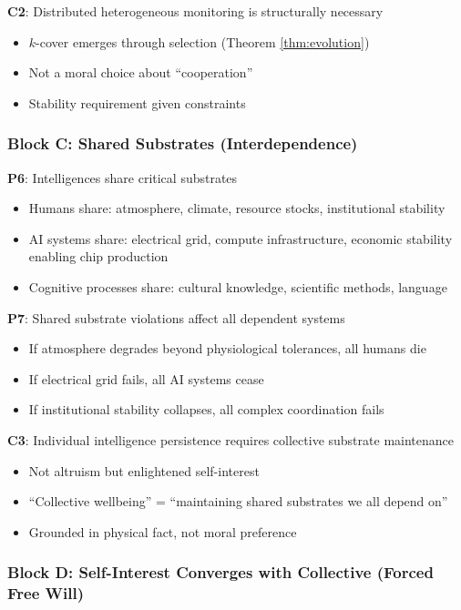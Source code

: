\documentclass[11pt,a4paper]{article}
\theoremstyle{definition}
\begin{document}
\textbf{C2}: Distributed heterogeneous monitoring is structurally necessary
\begin{itemize}
\item $k$-cover emerges through selection (Theorem \ref{thm:evolution})
\item Not a moral choice about ``cooperation''
\item Stability requirement given constraints
\end{itemize}

\subsubsection*{Block C: Shared Substrates (Interdependence)}

\textbf{P6}: Intelligences share critical substrates
\begin{itemize}
\item Humans share: atmosphere, climate, resource stocks, institutional stability
\item AI systems share: electrical grid, compute infrastructure, economic stability enabling chip production
\item Cognitive processes share: cultural knowledge, scientific methods, language
\end{itemize}

\textbf{P7}: Shared substrate violations affect all dependent systems
\begin{itemize}
\item If atmosphere degrades beyond physiological tolerances, all humans die
\item If electrical grid fails, all AI systems cease
\item If institutional stability collapses, all complex coordination fails
\end{itemize}

\textbf{C3}: Individual intelligence persistence requires collective substrate maintenance
\begin{itemize}
\item Not altruism but enlightened self-interest
\item ``Collective wellbeing'' = ``maintaining shared substrates we all depend on''
\item Grounded in physical fact, not moral preference
\end{itemize}

\subsubsection*{Block D: Self-Interest Converges with Collective (Forced Free Will)}
\end{document}
